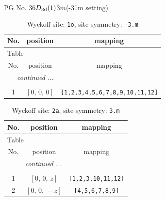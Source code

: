\documentclass[fleqn,8pt]{jsarticle}
\begin{document}
\setcounter{MaxMatrixCols}{32}

\renewcommand{\tablename}{Table~}
\renewcommand{\figurename}{Figure~}
\begin{center}
\LARGE
PG No. 36\quad$D_{\rm 3d}(1)$\quad$\bar{3}m$\quad(-31m setting)\quad[ trigonal ]
\end{center}
\renewcommand{\arraystretch}{1.2}
\begin{longtable}{ccc}
\caption{Wyckoff site: {\tt 1o}, site symmetry: {\tt -3.m}}
 \\
 \hline \hline
No. & position & mapping \\ \hline \endfirsthead

\multicolumn{2}{l}{\tablename\ \thetable{}} \\
 \hline \hline
No. & position & mapping \\ \hline \endhead

 \hline \hline
\multicolumn{2}{r}{\footnotesize\it continued ...} \\ \endfoot

 \hline \hline
\multicolumn{2}{r}{} \\ \endlastfoot

1 & $\left[ 0,\, 0,\, 0 \right]$ & {\tt [1,2,3,4,5,6,7,8,9,10,11,12]} \\
\end{longtable}
\renewcommand{\arraystretch}{1.2}
\begin{longtable}{ccc}
\caption{Wyckoff site: {\tt 2a}, site symmetry: {\tt 3.m}}
 \\
 \hline \hline
No. & position & mapping \\ \hline \endfirsthead

\multicolumn{2}{l}{\tablename\ \thetable{}} \\
 \hline \hline
No. & position & mapping \\ \hline \endhead

 \hline \hline
\multicolumn{2}{r}{\footnotesize\it continued ...} \\ \endfoot

 \hline \hline
\multicolumn{2}{r}{} \\ \endlastfoot

1 & $\left[ 0,\, 0,\, z \right]$ & {\tt [1,2,3,10,11,12]} \\ \hline
2 & $\left[ 0,\, 0,\, - z \right]$ & {\tt [4,5,6,7,8,9]} \\
\end{longtable}
\renewcommand{\arraystretch}{1.2}
\end{document}
